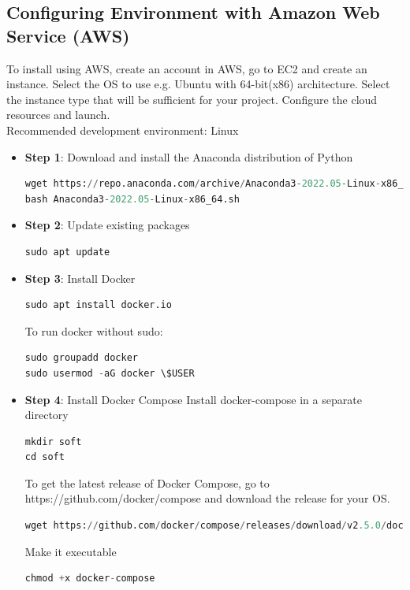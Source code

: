 \documentclass[letterpaper,12pt,notitlepage,twoside]{report}
\begin{document}
\subsection{Configuring Environment with Amazon Web Service (AWS)}
To install using AWS,  create an account in AWS, go to EC2 and create an instance. Select the OS to use e.g. Ubuntu with 64-bit(x86) architecture. Select the instance type that will be sufficient for your project. Configure the cloud resources and launch. \\
Recommended development environment: Linux

 \begin{itemize}
\item \textbf{Step 1}: Download and install the Anaconda distribution of Python 
\begin{lstlisting}[language=python, numbers=none]
wget https://repo.anaconda.com/archive/Anaconda3-2022.05-Linux-x86_64.sh
bash Anaconda3-2022.05-Linux-x86_64.sh
\end{lstlisting}
\item \textbf{Step 2}: Update existing packages
\begin{lstlisting}[language=python, numbers=none]
sudo apt update
\end{lstlisting}
\item \textbf{Step 3}: Install Docker
\begin{lstlisting}[language=python, numbers=none]
sudo apt install docker.io
\end{lstlisting}
To run docker without sudo:
\begin{lstlisting}[language=python, numbers=none]
sudo groupadd docker
sudo usermod -aG docker \$USER
\end{lstlisting}
\item \textbf{Step 4}: Install Docker Compose
Install docker-compose in a separate directory
\begin{lstlisting}[language=python, numbers=none]
mkdir soft
cd soft
\end{lstlisting}
To get the latest release of Docker Compose, go to https://github.com/docker/compose and download the release for your OS.
\begin{lstlisting}[language=python, numbers=none]
wget https://github.com/docker/compose/releases/download/v2.5.0/docker-compose-linux-x86_64 -O docker-compose
\end{lstlisting}
Make it executable
\begin{lstlisting}[language=python, numbers=none]
chmod +x docker-compose
\end{lstlisting}

\end{itemize}
\end{document}
